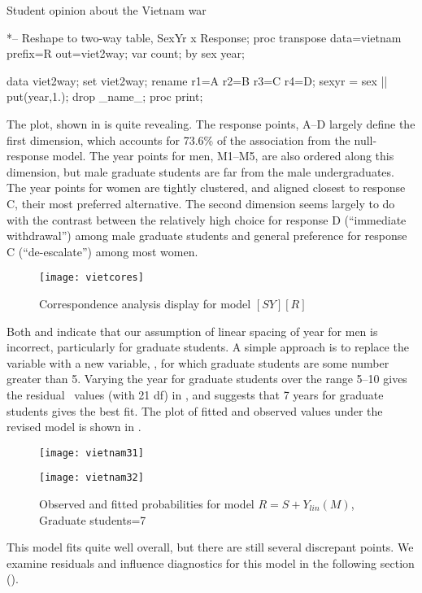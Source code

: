 \begin{Example}[vietnam2]{Student opinion about the Vietnam war}
\begin{listing}
*-- Reshape to two-way table, SexYr x Response;
proc transpose data=vietnam prefix=R out=viet2way;
   var count;
   by sex year;

data viet2way;
   set viet2way;
   rename r1=A r2=B r3=C r4=D;
   sexyr = sex || put(year,1.);
   drop _name_;
proc print;

\end{listing}

The plot, shown in  is quite revealing.
The response points, A--D
largely define the first dimension,
which accounts for 73.6\% of the association from the null-response model.
The year points for men, M1--M5,
are also ordered along this dimension, but male graduate students are far
from the male undergraduates.
The year points for women are tightly clustered, and aligned closest to
response C, their most preferred alternative.
The second dimension seems largely to do with the contrast between the relatively high choice for response D (``immediate withdrawal'')
among male graduate students and general preference for response C
(``de-escalate'') among most women.

\begin{figure}[htb]
  \centering
  \texttt{[image: vietcores]}
  \caption{Correspondence analysis display for model $[SY][R]$}%
  \label{fig:vietcores}
\end{figure}

Both  and  indicate that our
assumption of linear spacing of year for men is incorrect, particularly
for graduate students.
A simple approach is to replace the variable  with a new
variable, , for which graduate students are some number
greater than 5.
Varying the year for graduate students over the range 5--10 gives
the residual \GSQ\ values (with 21 df)
in , and suggests that
7 years for graduate students gives the best fit.  The plot
of fitted and observed values under the revised model is shown in .



\begin{figure}[htb]
 \begin{minipage}[t]{.49\linewidth}
  \texttt{[image: vietnam31]}
 \end{minipage}%
 \hfill
 \begin{minipage}[t]{.49\linewidth}
  \texttt{[image: vietnam32]}
 \end{minipage}
 \caption{Observed and fitted probabilities for model $R = S + Y_{lin}(M)$, Graduate students=7}\label{fig:vietnam3}
\end{figure}

This model fits quite well overall, but there are still several
discrepant points.
We examine residuals and influence diagnostics for this model in
the following section
().
\end{Example}
